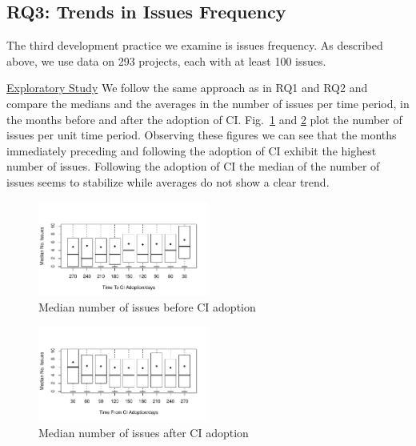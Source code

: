 


\subsection{RQ3: Trends in Issues Frequency}

The third development practice we examine is issues frequency.
As described above, we use data on 293 projects, each with at least 100 issues.

\noindent \underline{Exploratory Study}
We follow the same approach as in RQ1 and RQ2 and compare the medians and the averages in the number of issues per time period, in the months
before and after the adoption of CI.
Fig.~\ref{Fig:IssuesBefore} and \ref{Fig:IssuesAfter} plot the number of issues per unit time period.
Observing these figures we can see that the months immediately 
preceding and following the adoption of CI exhibit the highest number of issues.
Following the adoption of CI the median of the number of issues seems to stabilize while averages do
not show a clear trend. 


\begin{figure}[!t]
\centering
\includegraphics[width=0.5\textwidth]{issues_before.pdf}
\caption{Median number of issues before CI adoption}
\label{Fig:IssuesBefore}
\end{figure}


\begin{figure}[!t]
\centering
\includegraphics[width=0.5\textwidth]{issues_after.pdf}
\caption{Median number of issues after CI adoption}
\label{Fig:IssuesAfter}
\end{figure}

